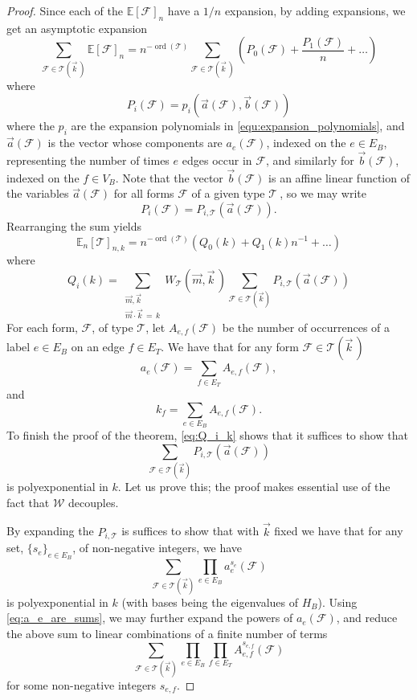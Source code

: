 \documentclass{memo-l}
\theoremstyle{plain}
\theoremstyle{definition}
\numberwithin{section}{chapter}
\numberwithin{equation}{chapter}
\DeclareMathOperator{\ord}{ord}
\theoremstyle{plain}
\theoremstyle{definition}
\newcommand\EE{\mathbb{E}}
\newcommand\cF{\mathcal{F}}
\newcommand\cT{\mathcal{T}}
\newcommand\cW{\mathcal{W}}
\begin{document}
\begin{proof}
Since each of the \( \EE[\cF]_n \) have a \( 1/n \) expansion, by adding
expansions, we get an asymptotic expansion \[ \sum_{\cF \in \cT(\vec k\,)}
\EE[\cF]_n = n^{-\ord(\cT)} \sum_{\cF \in \cT(\vec k\,)} \left( P_0(\cF) +
\frac{P_1(\cF)}{n} + \ldots \right) \] where \[ P_i(\cF) = p_i(\vec a(\cF),
\vec b(\cF)) \] where the \( p_i \) are the expansion polynomials in
\eqref{equ:expansion_polynomials}, and $\vec a(\cF)$ is the vector
whose components are $a_e(\cF)$, indexed on the $e\in E_B$, representing
the number of times $e$ edges occur in $\cF$, and similarly for
$\vec b(\cF)$, indexed on the $f\in V_B$. 
Note that the vector \( \vec
b(\cF) \) is an affine linear function of the variables \( \vec a(\cF) \)
for all forms \( \cF \) of a given type \( \cT\ \), so we may
write \[ P_i(\cF)
= P_{i,\cT}(\vec a(\cF) )  .
\] 
Rearranging the sum yields \[ \EE_n[\cT]_{n,k}
= n^{-\ord(\cT)} \left( Q_0(k) + Q_1(k)n^{-1} + \ldots \right) \] where 
\begin{equation}
\label{eq:Q_i_k}
Q_i(k) = \sum_{\substack{\vec m, \vec k \\ \vec m \cdot \vec k \,=\, k}}
W_\cT(\vec m, \vec k\,) \sum_{\cF \in \cT(\vec k)} P_{i,\cT}(\vec a(\cF))
\end{equation} 
For each form, \( \cF \), of type \( \cT \), let \( A_{e,f}(\cF) \) be
the number of occurrences of a label \( e \in E_B \) on an edge \( f \in
E_T \). We have that for any form $\cF\in\cT(\vec k\,)$
\begin{equation}
\label{eq:a_e_are_sums}
a_e(\cF) = \sum_{f \in E_T}
A_{e,f}(\cF), 
\end{equation} 
and 
\begin{equation}
\label{eq:k_f_are_sums}
k_f = \sum_{e \in E_B} A_{e,f}(\cF). 
\end{equation}
To finish the proof of the theorem, \eqref{eq:Q_i_k} shows that it
suffices to show that
\[ \sum_{\cF \in
\cT(\vec k)} P_{i,\cT}(\vec a(\cF)) \] is polyexponential in \(k\). 
Let us prove this; the proof makes essential use 
of the fact that $\cW$ decouples.

By expanding the $P_{i,\cT}$ is suffices to show that with $\vec k$ fixed
we have that for any set, $\{s_e\}_{e\in E_B}$, of non-negative integers,
we have
$$
\sum_{\cF\in\cT(\vec k)}\prod_{e\in E_B} a_e^{s_e}(\cF)
$$
is polyexponential in $k$ (with bases being the eigenvalues of $H_B$).
Using \eqref{eq:a_e_are_sums}, we may further expand the powers of 
$a_e(\cF)$, and reduce the above sum to linear combinations of a
finite number of terms
$$
\sum_{\cF\in\cT(\vec k)}\prod_{e\in E_B}\prod_{f\in E_T} A_{e,f}^{s_{e,f}}(\cF)
$$
for some non-negative integers $s_{e,f}$.


\end{proof}
\end{document}
